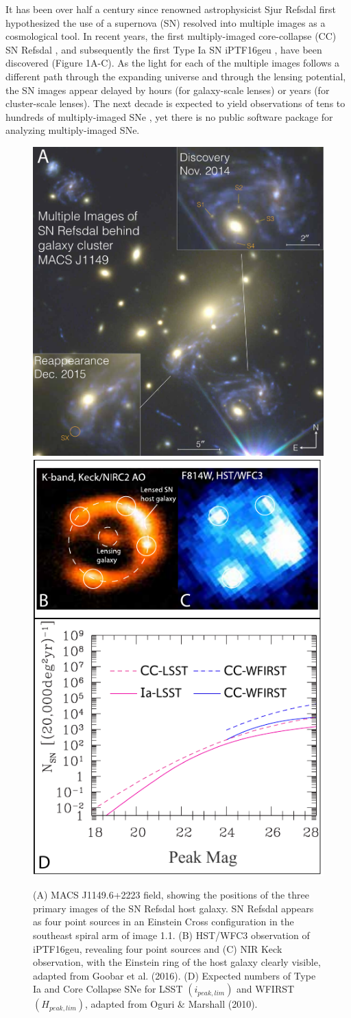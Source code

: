 \setlength{\belowcaptionskip}{-10pt}
\setlength{\abovecaptionskip}{-10pt}

It has been over half a century since renowned astrophysicist Sjur
Refsdal first hypothesized the use of a supernova (SN) resolved into
multiple images as a cosmological tool. In recent years, the first
multiply-imaged core-collapse (CC) SN Refsdal \citep{Kelly:2015a}, and
subsequently the first Type Ia SN iPTF16geu \citep{Goobar:2016}, have
been discovered (Figure 1A-C). As the light for each of the multiple
images follows a different path through the expanding universe and
through the lensing potential, the SN images appear delayed by hours
(for galaxy-scale lenses) or years (for cluster-scale lenses). The
next decade is expected to yield observations of tens to hundreds of
multiply-imaged SNe \citep{Oguri:2010a}, yet there is no public
software package for analyzing multiply-imaged SNe.

\begin{figure}
\includegraphics[height=.3\textwidth]{FIG/refsdal_summary2}
\includegraphics[height=.3\textwidth]{FIG/lensed3}
\caption{
\noindent\fontsize{10}{14}\selectfont
(A) MACS J1149.6+2223 field, showing the positions of the three primary
images of the SN Refsdal host galaxy. SN
Refsdal appears as four point sources in an Einstein Cross
configuration in the southeast spiral arm of image 1.1. (B) HST/WFC3 observation
of iPTF16geu, revealing four point sources and (C) NIR Keck observation, with the 
Einstein ring of the host galaxy clearly visible, adapted from Goobar et al. (2016)\cite{Goobar:2016}. (D)
Expected numbers of Type Ia and Core Collapse SNe for LSST $(i_{peak,lim})$ and 
WFIRST $(H_{peak,lim})$, adapted from Oguri $\&$ Marshall (2010)\cite{Oguri:2010a}.}
\end{figure}

